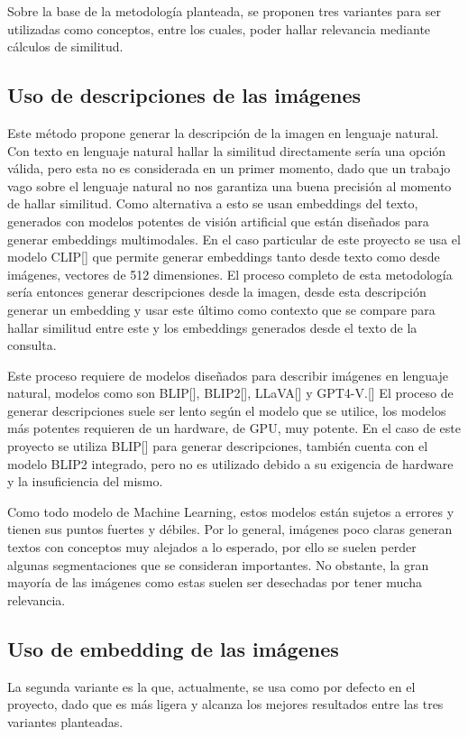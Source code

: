 Sobre la base de la metodolog\'ia planteada, se proponen tres variantes para ser utilizadas como conceptos, entre los cuales, poder hallar relevancia mediante cálculos de similitud.

\subsection{Uso de descripciones de las imágenes}
Este método propone generar la descripción de la imagen en lenguaje natural. Con texto en lenguaje natural hallar la similitud directamente sería una opción válida, pero esta no es considerada en un primer momento, dado que un trabajo vago sobre el lenguaje natural no nos garantiza una buena precisión al momento de hallar similitud. Como alternativa a esto se usan embeddings del texto, generados con modelos potentes de visión artificial que están diseñados para generar embeddings multimodales. En el caso particular de este proyecto se usa el modelo CLIP[\cite{clip}] que permite generar embeddings tanto desde texto como desde imágenes, vectores de 512 dimensiones. El proceso completo de esta metodología sería entonces generar descripciones desde la imagen, desde esta descripción generar un embedding y usar este último como contexto que se compare para hallar similitud entre este y los embeddings generados desde el texto de la consulta.

Este proceso requiere de modelos diseñados para describir imágenes en lenguaje natural, modelos como son BLIP[\cite{blip}], BLIP2[\cite{blip-2}], LLaVA[\cite{llava}] y GPT4-V.[\cite{gpt-4v}] El proceso de generar descripciones suele ser lento según el modelo que se utilice, los modelos más potentes requieren de un hardware, de GPU, muy potente. En el caso de este proyecto se utiliza BLIP[\cite{blip}] para generar descripciones, también cuenta con el modelo BLIP2 integrado, pero no es utilizado debido a su exigencia de hardware y la insuficiencia del mismo.

Como todo modelo de Machine Learning, estos modelos están sujetos a errores y tienen sus puntos fuertes y débiles. Por lo general, imágenes poco claras generan textos con conceptos muy alejados a lo esperado, por ello se suelen perder algunas segmentaciones que se consideran importantes. No obstante, la gran mayoría de las imágenes como estas suelen ser desechadas por tener mucha relevancia.

\subsection{Uso de embedding de las imágenes}
La segunda variante es la que, actualmente, se usa como por defecto en el proyecto, dado que es más ligera y alcanza los mejores resultados entre las tres variantes planteadas.

